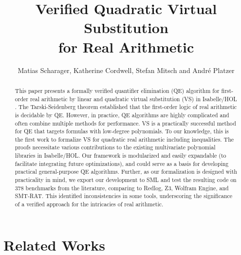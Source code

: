 \documentclass[11pt,a4paper]{article}
\begin{document}
\title{Verified Quadratic Virtual Substitution\texorpdfstring{\\}{} for Real Arithmetic}

\author{Matias Scharager,
Katherine Cordwell,
Stefan Mitsch and
Andr\'{e} Platzer}


\maketitle

\begin{abstract}
This paper presents a formally verified quantifier elimination (QE) algorithm for first-order real arithmetic by linear and quadratic virtual substitution (VS) in Isabelle/HOL \cite{weispfenning1988complexity,weispfenning1997quantifier}.
The Tarski-Seidenberg theorem established that the first-order logic of real arithmetic is decidable by QE.
However, in practice, QE algorithms are highly complicated and often combine multiple methods for performance.
VS is a practically successful method for QE that targets formulas with low-degree polynomials.
To our knowledge, this is the first work to formalize VS for quadratic real arithmetic including inequalities.
The proofs necessitate various contributions to the existing multivariate polynomial libraries in Isabelle/HOL.
Our framework is modularized and easily expandable (to facilitate integrating future optimizations), and could serve as a basis for developing practical general-purpose QE algorithms.
Further, as our formalization is designed with practicality in mind, we export our development to SML and test the resulting code on 378 benchmarks from the literature, comparing to Redlog, Z3, Wolfram Engine, and SMT-RAT.
This identified inconsistencies in some tools, underscoring the significance of a verified approach for the intricacies of real arithmetic.
\end{abstract}

\tableofcontents

\section{Related Works}
\end{document}

